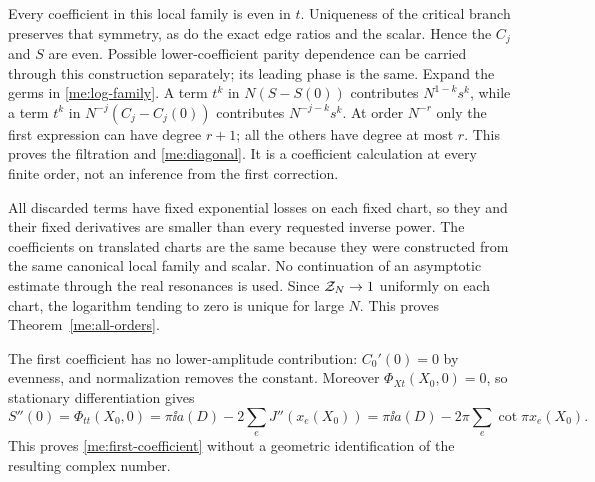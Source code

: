 Every coefficient in this local family is even in $t$. Uniqueness
of the critical branch preserves that symmetry, as do the exact
edge ratios and the scalar. Hence the $C_j$ and $S$ are even.
Possible lower-coefficient parity dependence can be carried
through this construction separately; its leading phase is the
same. Expand the germs in \eqref{me:log-family}. A term $t^k$ in
$N(S-S(0))$ contributes $N^{1-k}s^k$, while a term $t^k$ in
$N^{-j}(C_j-C_j(0))$ contributes $N^{-j-k}s^k$. At order $N^{-r}$
only the first expression can have degree $r+1$; all the others
have degree at most $r$. This proves the filtration and
\eqref{me:diagonal}. It is a coefficient calculation at every
finite order, not an inference from the first correction.

All discarded terms have fixed exponential losses on each fixed
chart, so they and their fixed derivatives are smaller than every
requested inverse power. The coefficients on translated charts
are the same because they were constructed from the same canonical
local family and scalar. No continuation of an asymptotic estimate
through the real resonances is used. Since $\mathcal Z_N\to1$ uniformly
on each chart, the logarithm tending to zero is unique for large
$N$. This proves Theorem~\ref{me:all-orders}.

The first coefficient has no lower-amplitude contribution:
$C_0'(0)=0$ by evenness, and normalization removes the constant.
Moreover $\Phi_{Xt}(X_0,0)=0$, so stationary differentiation gives
\[
 S''(0)=\Phi_{tt}(X_0,0)
       =\pi\ii a(D)-2\sum_eJ''(x_e(X_0))
       =\pi\ii a(D)-2\pi\sum_e\cot\pi x_e(X_0).
\]
This proves \eqref{me:first-coefficient} without a geometric
identification of the resulting complex number.
